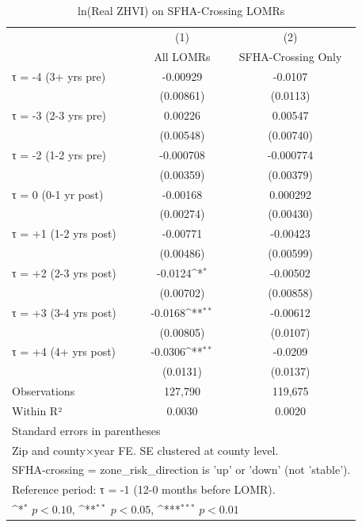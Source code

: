 \begin{table}[htbp]\centering
\def\sym#1{\ifmmode^{#1}\else\(^{#1}\)\fi}
\caption{ln(Real ZHVI) on SFHA-Crossing LOMRs}
\begin{tabular}{l*{2}{c}}
\hline\hline
                    &\multicolumn{1}{c}{(1)}&\multicolumn{1}{c}{(2)}\\
                    &\multicolumn{1}{c}{All LOMRs}&\multicolumn{1}{c}{SFHA-Crossing Only}\\
\hline
τ = -4 (3+ yrs pre) &    -0.00929         &     -0.0107         \\
                    &   (0.00861)         &    (0.0113)         \\
[1em]
τ = -3 (2-3 yrs pre)&     0.00226         &     0.00547         \\
                    &   (0.00548)         &   (0.00740)         \\
[1em]
τ = -2 (1-2 yrs pre)&   -0.000708         &   -0.000774         \\
                    &   (0.00359)         &   (0.00379)         \\
[1em]
τ = 0 (0-1 yr post) &    -0.00168         &    0.000292         \\
                    &   (0.00274)         &   (0.00430)         \\
[1em]
τ = +1 (1-2 yrs post)&    -0.00771         &    -0.00423         \\
                    &   (0.00486)         &   (0.00599)         \\
[1em]
τ = +2 (2-3 yrs post)&     -0.0124\sym{*}  &    -0.00502         \\
                    &   (0.00702)         &   (0.00858)         \\
[1em]
τ = +3 (3-4 yrs post)&     -0.0168\sym{**} &    -0.00612         \\
                    &   (0.00805)         &    (0.0107)         \\
[1em]
τ = +4 (4+ yrs post)&     -0.0306\sym{**} &     -0.0209         \\
                    &    (0.0131)         &    (0.0137)         \\
\hline
Observations        &     127,790         &     119,675         \\
Within R²           &      0.0030         &      0.0020         \\
\hline\hline
\multicolumn{3}{l}{\footnotesize Standard errors in parentheses}\\
\multicolumn{3}{l}{\footnotesize Zip and county×year FE. SE clustered at county level.}\\
\multicolumn{3}{l}{\footnotesize SFHA-crossing = zone\_risk\_direction is 'up' or 'down' (not 'stable').}\\
\multicolumn{3}{l}{\footnotesize Reference period: τ = -1 (12-0 months before LOMR).}\\
\multicolumn{3}{l}{\footnotesize \sym{*} \(p<0.10\), \sym{**} \(p<0.05\), \sym{***} \(p<0.01\)}\\
\end{tabular}
\end{table}
